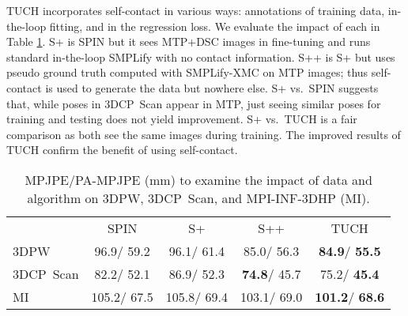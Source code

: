 \documentclass[final]{cvpr}
\newcommand{\threedcpscan}{\mbox{3DCP Scan}\xspace}
\newcommand{\smplifyxmc}{\mbox{SMPLify-XMC}\xspace}
\theoremstyle{definition}
\begin{document}
TUCH incorporates self-contact in various ways: annotations of training data, in-the-loop fitting, and in the regression loss. 
We evaluate the impact of each in Table \ref{tab:ablation_study}. 
S+ is SPIN but it sees MTP+DSC images in fine-tuning and runs standard in-the-loop SMPLify with no contact information.
S++ is S+ but uses pseudo ground truth computed with \smplifyxmc on MTP
images; thus self-contact is used to generate the data but nowhere else.
S+ vs.~SPIN suggests that, while poses in \threedcpscan appear in MTP,
just seeing similar poses for training and testing does not yield improvement.
S+ vs.~TUCH is a fair comparison as both see the same images during training. The improved results of TUCH confirm the benefit of using self-contact.
\begin{table}[t]
	\centering
	\begin{adjustbox}{max width=\linewidth}
		\begin{tabular}{lcccc}
		\toprule[1pt]
			& SPIN         & S+        & S++       & TUCH         \\ \cline{1-5} 
			3DPW    & 96.9/ 59.2  & 96.1/ 61.4  & 85.0/ 56.3  & \textbf{84.9}/ \textbf{55.5}  \\
			\threedcpscan & 82.2/ 52.1  & 86.9/ 52.3  & \textbf{74.8}/ 45.7  & 75.2/ \textbf{45.4}  \\
			MI      & 105.2/ 67.5 & 105.8/ 69.4 & 103.1/ 69.0 & \textbf{101.2}/ \textbf{68.6} \\
		\bottomrule[1pt]
		\end{tabular}
	\end{adjustbox}
	\caption{MPJPE/PA-MPJPE (mm) to examine the impact of data and algorithm on 3DPW, \threedcpscan, and MPI-INF-3DHP (MI).}
	\label{tab:ablation_study}
\end{table}
\end{document}
